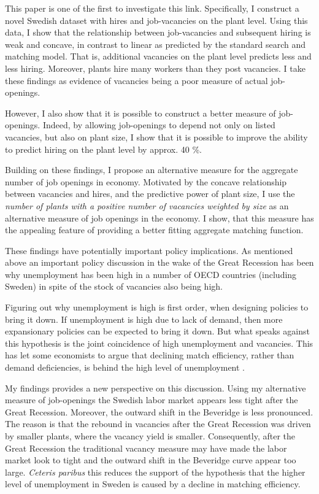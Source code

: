 This paper is one of the first to investigate this link. Specifically, I construct a novel Swedish dataset with hires and job-vacancies on the plant level. Using this data, I show that the relationship between job-vacancies and subsequent hiring is weak and concave, in contrast to linear as predicted by the standard search and matching model. That is, additional vacancies on the plant level predicts less and less hiring. Moreover, plants hire many workers than they post vacancies.  I take these findings as evidence of vacancies being a poor measure of actual job-openings. 

However, I also show that it is possible to construct a better measure of job-openings. Indeed, by allowing job-openings to depend not only on listed vacancies, but also on plant size, I show that it is possible to improve the ability to predict hiring on the plant level by approx. 40 \%. 

Building on these findings, I propose an alternative measure for the aggregate number of job openings in economy. Motivated by the concave relationship between vacancies and hires, and the predictive power of plant size, I use the \emph{number of plants with a positive number of vacancies weighted by size} as an alternative measure of job openings in the economy. I show, that this measure has the appealing feature of providing a better fitting aggregate matching function. 

These findings have potentially important policy implications. As mentioned above an important policy discussion in the wake of the Great Recession has been why unemployment has been high in a number of OECD countries (including Sweden) in spite of the stock of vacancies also being high. 

Figuring out why unemployment is high is first order, when designing policies to bring it down. If unemployment is high due to lack of demand, then more expansionary policies can be expected to bring it down. But what speaks against this hypothesis is the joint coincidence of high unemployment and vacancies. This has let some economists to argue that declining match efficiency, rather than demand deficiencies, is behind the high level of unemployment \citep{Hall2015, Riksbank2012}.

My findings provides a new perspective on this discussion. Using my alternative measure of job-openings the Swedish labor market appears less tight after the Great Recession. Moreover, the outward shift in the Beveridge is less pronounced. The reason is that the rebound in vacancies after the Great Recession was driven by smaller plants, where the vacancy yield is smaller. Consequently, after the Great Recession the traditional vacancy measure may have made the labor market look to tight and the outward shift in the Beveridge curve appear too large. \emph{Ceteris paribus} this reduces the support of the hypothesis that the higher level of unemployment in Sweden is caused by a decline in matching efficiency.

